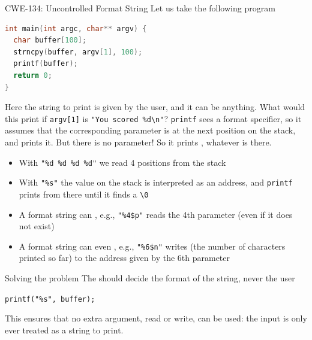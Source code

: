 \begin{parag}{CWE-134: Uncontrolled Format String}
    Let us take the following program
    \begin{lstlisting}[language=C]
int main(int argc, char** argv) {
  char buffer[100];
  strncpy(buffer, argv[1], 100);
  printf(buffer);
  return 0;
}
    \end{lstlisting}
    Here the string to print is given by the user, and it can be anything. What would this print if \texttt{argv[1]} is \texttt{"You scored \%d\textbackslash n"}? \texttt{printf} sees a format specifier, so it assumes that the corresponding parameter is at the next position on the stack, and prints it. But there is no parameter! So it prints , whatever is there.
    \begin{itemize}
        \item With \texttt{"\%d \%d \%d \%d"} we read 4 positions from the stack
        \item With \texttt{"\%s"} the value on the stack is interpreted as an address, and \texttt{printf} prints from there until it finds a \texttt{\textbackslash 0}
        \item A format string can , e.g., \texttt{"\%4\$p"} reads the 4th parameter (even if it does not exist)
        \item A format string can even , e.g., \texttt{"\%6\$n"} writes (the number of characters printed so far) to the address given by the 6th parameter
    \end{itemize}
    \begin{subparag}{Solving the problem}
        The  should decide the format of the string, never the user
        \begin{center}
            \texttt{printf("\%s", buffer);}
        \end{center}
        This ensures that no extra argument, read or write, can be used: the input is only ever treated as a string to print.
    \end{subparag}
\end{parag}

